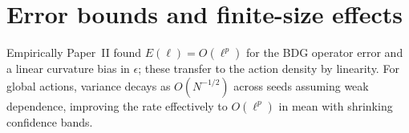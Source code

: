 \section{Error bounds and finite-size effects}
Empirically Paper~II found $E(\ell)=O(\ell^p)$ for the BDG operator error and a linear curvature bias in $\epsilon$; these transfer to the action density by linearity. For global actions, variance decays as $O(N^{-1/2})$ across seeds assuming weak dependence, improving the rate effectively to $O(\ell^{p})$ in mean with shrinking confidence bands.

\nocite{AslanbeigiEtAl2014,Glaser2011DICE,Sorkin2007,Meyer1988}

\FloatBarrier
\clearpage




